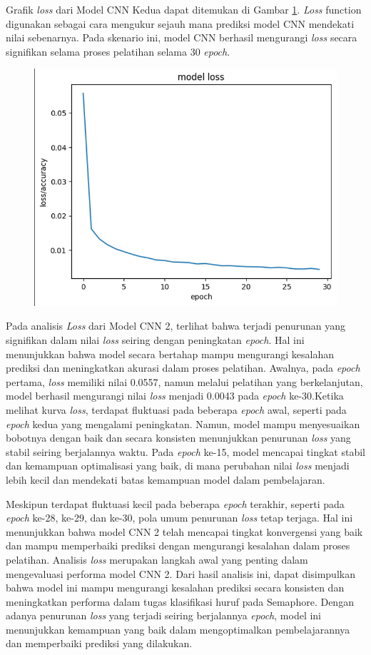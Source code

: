 Grafik \textit{loss} dari Model CNN Kedua dapat ditemukan di Gambar \ref{fig:lossModelCNNKedua}. \textit{Loss} function digunakan sebagai cara mengukur sejauh mana prediksi model CNN mendekati nilai sebenarnya. Pada skenario ini, model CNN berhasil mengurangi \textit{loss} secara signifikan selama proses pelatihan selama 30\textit{ epoch}.

\begin{figure}[!hbt]
	\centering
	\includegraphics[width=0.7\linewidth]{gambar/bener/Loss_ModelCNN2.png}
	\label{fig:lossModelCNNKedua}
\end{figure}

Pada analisis \textit{Loss} dari Model CNN 2, terlihat bahwa terjadi penurunan yang signifikan dalam nilai \textit{loss} seiring dengan peningkatan \textit{epoch}. Hal ini menunjukkan bahwa model secara bertahap mampu mengurangi kesalahan prediksi dan meningkatkan akurasi dalam proses pelatihan. Awalnya, pada \textit{epoch} pertama, \textit{loss} memiliki nilai 0.0557, namun melalui pelatihan yang berkelanjutan, model berhasil mengurangi nilai \textit{loss} menjadi 0.0043 pada \textit{epoch} ke-30.Ketika melihat kurva \textit{loss}, terdapat fluktuasi pada beberapa \textit{epoch} awal, seperti pada \textit{epoch} kedua yang mengalami peningkatan. Namun, model mampu menyesuaikan bobotnya dengan baik dan secara konsisten menunjukkan penurunan \textit{loss} yang stabil seiring berjalannya waktu. Pada \textit{epoch} ke-15, model mencapai tingkat stabil dan kemampuan optimalisasi yang baik, di mana perubahan nilai \textit{loss} menjadi lebih kecil dan mendekati batas kemampuan model dalam pembelajaran.

Meskipun terdapat fluktuasi kecil pada beberapa \textit{epoch} terakhir, seperti pada \textit{epoch} ke-28, ke-29, dan ke-30, pola umum penurunan \textit{loss} tetap terjaga. Hal ini menunjukkan bahwa model CNN 2 telah mencapai tingkat konvergensi yang baik dan mampu memperbaiki prediksi dengan mengurangi kesalahan dalam proses pelatihan. Analisis \textit{loss} merupakan langkah awal yang penting dalam mengevaluasi performa model CNN 2. Dari hasil analisis ini, dapat disimpulkan bahwa model ini mampu mengurangi kesalahan prediksi secara konsisten dan meningkatkan performa dalam tugas klasifikasi huruf pada Semaphore. Dengan adanya penurunan \textit{loss} yang terjadi seiring berjalannya \textit{epoch}, model ini menunjukkan kemampuan yang baik dalam mengoptimalkan pembelajarannya dan memperbaiki prediksi yang dilakukan.

